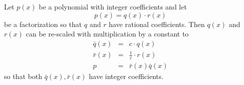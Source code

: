 \begin{frame}
\begin{theorem}
Let $p(x)$ be a polynomial with integer coefficients and let 
\[
p(x)=q(x)\cdot r(x)
\] be a factorization so that $q$ and $r$ have rational coefficients. Then $q(x)$ and $r(x)$ can be re-scaled with multiplication by a constant to 
\[
\begin{array}{rcl}
\bar q(x) &=& c\cdot q(x)\\ 
\bar r(x) &=& \frac{1}{c} \cdot r(x)\\
p&=&\bar r(x)\bar q(x)
\end{array}
\] so that both $\bar q(x),\bar r(x)$ have integer coefficients.
\end{theorem}
\end{frame}